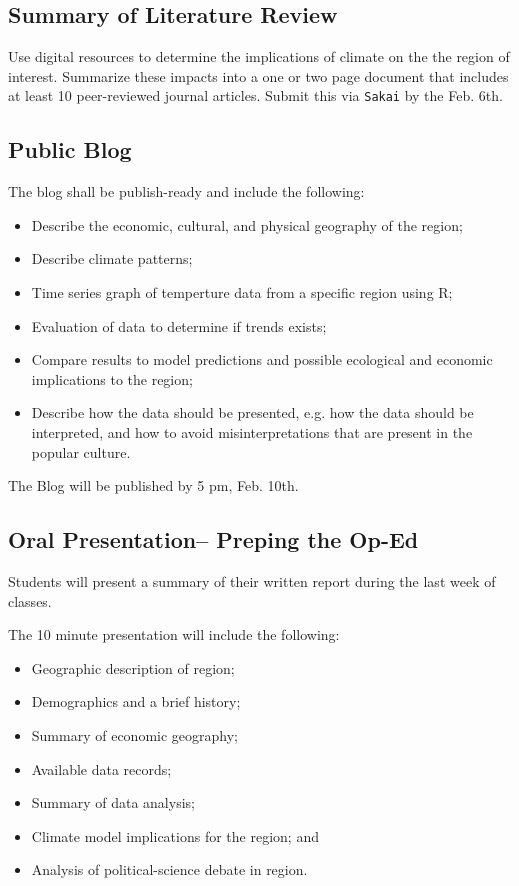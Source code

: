 \documentclass{article}\usepackage[]{graphicx}\usepackage[]{color}
\begin{document}
\subsection{Summary of Literature Review}

Use digital resources to determine the implications of climate on the the region of interest. Summarize these impacts into a one or two page document that includes at least 10 peer-reviewed journal articles. Submit this via \texttt{Sakai} by the Feb. 6th. 

\subsection{Public Blog}

The blog shall be publish-ready and include the following: 

\begin{itemize}
  \item Describe the economic, cultural, and physical geography of the region;
  \item Describe climate patterns;
  \item Time series graph of temperture data from a specific region using R;
  \item Evaluation of data to determine if trends exists;
  \item Compare results to model predictions and possible ecological and economic implications to the region; 
  \item Describe how the data should be presented, e.g. how the data should be interpreted, and how to avoid misinterpretations that are present in the popular culture.
  
\end{itemize}

The Blog will be published by 5 pm, Feb. 10th.

\subsection{Oral Presentation-- Preping the Op-Ed}

Students will present a summary of their written report during the last week of classes. 

The 10 minute presentation will include the following:

\begin{itemize}
  \item Geographic description of region;
  \item Demographics and a brief history;
  \item Summary of economic geography;
  \item Available data records;
  \item Summary of data analysis;
  \item Climate model implications for the region; and
  \item Analysis of political-science debate in region.
  
\end{itemize}
\end{document}
